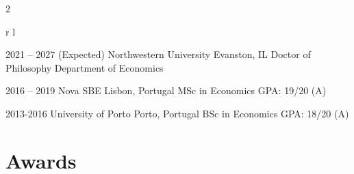 \documentclass[
	10pt, %
]{FreemanCV}
\begin{document}
\begin{paracol}{2}


\begin{supertabular}{r l} %

	
	\qualificationentry
		{2021 -- 2027 (Expected)} %
		{Northwestern University} %
		{Evanston, IL} %
		{Doctor of Philosophy} %
		{Department of Economics} %
		


	
	\qualificationentry
		{2016 -- 2019} %
		{Nova SBE} %
		{Lisbon, Portugal} %
		{MSc in Economics} %
		{GPA: 19/20 (A)} %
		
	
	\qualificationentry
		{2013-2016} %
		{University of Porto} %
		{Porto, Portugal} %
		{BSc in Economics} %
		{GPA: 18/20 (A)} %
		
	
\end{supertabular}


\section{Awards}




\end{paracol}
\end{document}
